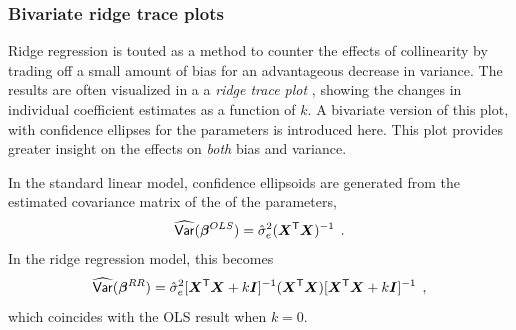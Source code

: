 \subsubsection{Bivariate ridge trace plots}\label{sec:ridge2}

Ridge regression is touted as a method to counter the effects
of collinearity by trading off a small amount of bias for an
advantageous decrease in variance.  The results are often 
visualized in a a \emph{ridge trace plot}
\citep{HoerlKennard:1970b},
showing the changes
in individual coefficient estimates as a function of $k$.
A bivariate version of this plot, with confidence ellipses for
the parameters is introduced here.  This plot provides greater
insight on the effects on \emph{both} bias and variance.

In the standard linear model, confidence ellipsoids are generated
from the estimated covariance matrix of the of the parameters,
\begin{equation*}
\widehat{\mathsf{Var}} (\bm{\beta}^{OLS}) = \hat{\sigma}^2_e (\bm{X}^\mathsf{T} \bm{X})^{-1} \:\: .
\end{equation*}
In the ridge regression model, this becomes 
\citep{Marquardt:1970}
\begin{equation}
\widehat{\mathsf{Var}} (\bm{\beta}^{RR}) = \hat{\sigma}^2_e 
    [\bm{X}^\mathsf{T} \bm{X} + k \bm{I}]^{-1}
    (\bm{X}^\mathsf{T} \bm{X})
    [\bm{X}^\mathsf{T} \bm{X} + k \bm{I}]^{-1} \:\: ,
\end{equation}
which coincides with the OLS result when $k=0$.
	

